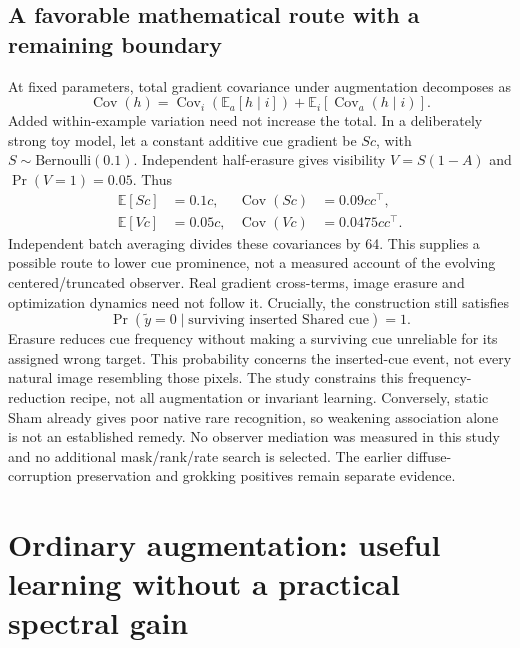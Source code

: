 \documentclass[10pt]{article}
\newcommand{\E}{\mathbb{E}}
\newcommand{\Cov}{\operatorname{Cov}}
\begin{document}
\subsection{A favorable mathematical route with a remaining boundary}
At fixed parameters, total gradient covariance under augmentation decomposes as
\begin{equation}
\Cov(h)=\Cov_i\!\left(\E_a[h\mid i]\right)+\E_i\!\left[\Cov_a(h\mid i)\right].
\end{equation}
Added within-example variation need not increase the total. In a deliberately strong toy model, let a constant additive cue gradient be $Sc$, with $S\sim\mathrm{Bernoulli}(0.1)$. Independent half-erasure gives visibility $V=S(1-A)$ and $\Pr(V=1)=0.05$. Thus
\begin{align}
\E[Sc]&=0.1c,& \Cov(Sc)&=0.09cc^\top,\\
\E[Vc]&=0.05c,& \Cov(Vc)&=0.0475cc^\top.
\end{align}
Independent batch averaging divides these covariances by 64. This supplies a possible route to lower cue prominence, not a measured account of the evolving centered/truncated observer. Real gradient cross-terms, image erasure and optimization dynamics need not follow it. Crucially, the construction still satisfies
\begin{equation}
\Pr(\widetilde y=0\mid\text{surviving inserted Shared cue})=1.
\end{equation}
Erasure reduces cue frequency without making a surviving cue unreliable for its assigned wrong target. This probability concerns the inserted-cue event, not every natural image resembling those pixels. The study constrains this frequency-reduction recipe, not all augmentation or invariant learning. Conversely, static Sham already gives poor native rare recognition, so weakening association alone is not an established remedy. No observer mediation was measured in this study and no additional mask/rank/rate search is selected. The earlier diffuse-corruption preservation and grokking positives remain separate evidence.

\clearpage
\section{Ordinary augmentation: useful learning without a practical spectral gain}\label{app:ordinary-augmentation}
\end{document}
